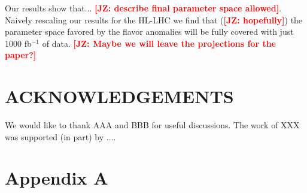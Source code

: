 \documentclass[11pt]{cernrep}
\def\JZ#1{{\bf  \textcolor{red}{[JZ: {#1}]}}}
\begin{document}
Our results show that... \JZ{describe final parameter space allowed}.
Naively rescaling our results for the HL-LHC we find that (\JZ{hopefully}) the parameter space favored by the flavor anomalies will be fully covered with just 1000 fb$^{-1}$ of data. \JZ{Maybe we will leave the projections for the paper?}


\section*{ACKNOWLEDGEMENTS}
We would like to thank AAA and BBB for useful discussions.
The work of XXX was supported (in part) by ....



\appendix
\section{Appendix A}




\end{document}
